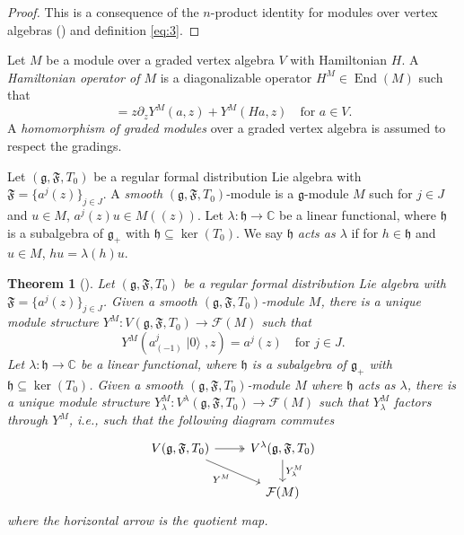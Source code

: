 \documentclass[a4paper, 12pt, reqno]{amsart}
\newtheorem{theorem}{Theorem}[section]
\theoremstyle{remark}
\DeclareMathOperator{\vac}{|0\rangle}
\DeclareMathOperator{\End}{End}
\begin{document}
\begin{proof}
  This is a consequence of the $n$-product identity for modules over vertex algebras (\cite[(5.2.16)]{lepowsky_introduction_2004}) and definition \eqref{eq:3}.
\end{proof}

Let $M$ be a module over a graded vertex algebra $V$ with Hamiltonian $H$.
A \emph{Hamiltonian operator of $M$} is a diagonalizable operator $H^M \in \End(M)$ such that
\begin{equation*}
  [H^M, Y^M(a, z)] = z\partial_zY^M(a, z) + Y^M(Ha, z) \quad \text{for $a \in V$}.
\end{equation*}
A \emph{homomorphism of graded modules} over a graded vertex algebra is assumed to respect the gradings.

Let $(\mathfrak{g}, \mathfrak{F}, T_0)$ be a regular formal distribution Lie algebra with $\mathfrak{F} = \{a^j(z)\}_{j \in J}$.
A \emph{smooth} $(\mathfrak{g}, \mathfrak{F}, T_0)$-module is a $\mathfrak{g}$-module $M$ such for $j \in J$ and $u \in M$, $a^j(z)u \in M((z))$.
Let $\lambda: \mathfrak{h} \to \mathbb{C}$ be a linear functional, where $\mathfrak{h}$ is a subalgebra of $\mathfrak{g}_+$ with $\mathfrak{h} \subseteq \ker(T_0)$.
We say $\mathfrak{h}$ \emph{acts as $\lambda$} if for $h \in \mathfrak{h}$ and $u \in M$, $hu = \lambda(h)u$.

\begin{theorem}[{\cite[Theorem 2.15]{li_vertex_2004}}]
  \label{thr:8}
  Let $(\mathfrak{g}, \mathfrak{F}, T_0)$ be a regular formal distribution Lie algebra with $\mathfrak{F} = \{a^j(z)\}_{j \in J}$.
  Given a smooth $(\mathfrak{g}, \mathfrak{F}, T_0)$-module $M$, there is a unique module structure $Y^M: V(\mathfrak{g}, \mathfrak{F}, T_0) \to \mathcal{F}(M)$ such that
  \begin{equation*}
    Y^M(a^j_{(-1)}\vac, z) = a^j(z) \quad \text{for $j \in J$}.
  \end{equation*}
  Let $\lambda: \mathfrak{h} \to \mathbb{C}$ be a linear functional, where $\mathfrak{h}$ is a subalgebra of $\mathfrak{g}_+$ with $\mathfrak{h} \subseteq \ker(T_0)$.
  Given a smooth $(\mathfrak{g}, \mathfrak{F}, T_0)$-module $M$ where $\mathfrak{h}$ acts as $\lambda$, there is a unique module structure $Y^M_{\lambda}: V^{\lambda}(\mathfrak{g}, \mathfrak{F}, T_0) \to \mathcal{F}(M)$ such that $Y^M_{\lambda}$ factors through $Y^M$, i.e., such that the following diagram commutes
  \begin{equation*}
    \begin{tikzcd}
      V(\mathfrak{g}, \mathfrak{F}, T_0) \arrow[r, two heads] \arrow[rd, "{Y^M}"'] & {V^{\lambda}(\mathfrak{g}, \mathfrak{F}, T_0)} \arrow[d, "{Y^M_{\lambda}}"] \\
      & {\mathcal{F}(M)}
    \end{tikzcd}
  \end{equation*}
  where the horizontal arrow is the quotient map.
\end{theorem}
\end{document}
